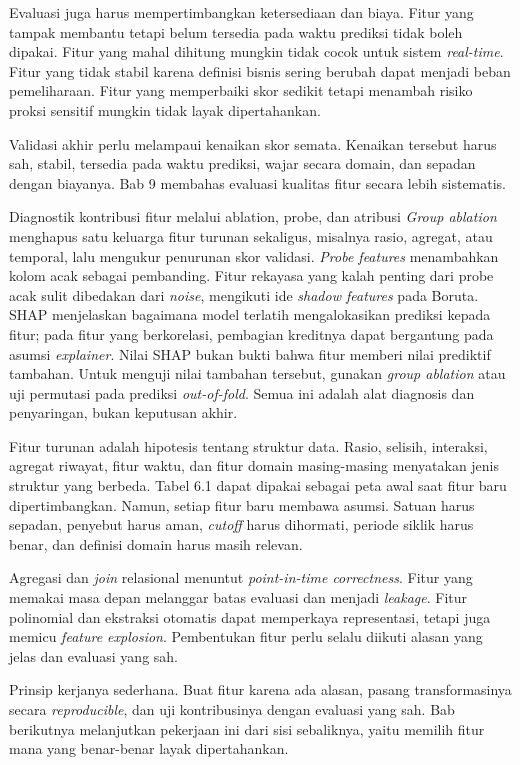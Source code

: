 Evaluasi juga harus mempertimbangkan ketersediaan dan biaya. Fitur yang tampak membantu tetapi belum tersedia pada waktu prediksi tidak boleh dipakai. Fitur yang mahal dihitung mungkin tidak cocok untuk sistem \emph{real-time}. Fitur yang tidak stabil karena definisi bisnis sering berubah dapat menjadi beban pemeliharaan. Fitur yang memperbaiki skor sedikit tetapi menambah risiko proksi sensitif mungkin tidak layak dipertahankan.

Validasi akhir perlu melampaui kenaikan skor semata. Kenaikan tersebut harus sah, stabil, tersedia pada waktu prediksi, wajar secara domain, dan sepadan dengan biayanya. Bab 9 membahas evaluasi kualitas fitur secara lebih sistematis.

\begin{pendalaman}{Diagnostik kontribusi fitur melalui ablation, probe, dan atribusi}
\emph{Group ablation} menghapus satu keluarga fitur turunan sekaligus, misalnya rasio, agregat, atau temporal, lalu mengukur penurunan skor validasi. \emph{Probe features} menambahkan kolom acak sebagai pembanding. Fitur rekayasa yang kalah penting dari probe acak sulit dibedakan dari \emph{noise}, mengikuti ide \emph{shadow features} pada Boruta. SHAP menjelaskan bagaimana model terlatih mengalokasikan prediksi kepada fitur; pada fitur yang berkorelasi, pembagian kreditnya dapat bergantung pada asumsi \emph{explainer}. Nilai SHAP bukan bukti bahwa fitur memberi nilai prediktif tambahan. Untuk menguji nilai tambahan tersebut, gunakan \emph{group ablation} atau uji permutasi pada prediksi \emph{out-of-fold}. Semua ini adalah alat diagnosis dan penyaringan, bukan keputusan akhir.
\end{pendalaman}

\begin{sintesis}

Fitur turunan adalah hipotesis tentang struktur data. Rasio, selisih, interaksi, agregat riwayat, fitur waktu, dan fitur domain masing-masing menyatakan jenis struktur yang berbeda. Tabel 6.1 dapat dipakai sebagai peta awal saat fitur baru dipertimbangkan. Namun, setiap fitur baru membawa asumsi. Satuan harus sepadan, penyebut harus aman, \emph{cutoff} harus dihormati, periode siklik harus benar, dan definisi domain harus masih relevan.

Agregasi dan \emph{join} relasional menuntut \emph{point-in-time correctness}. Fitur yang memakai masa depan melanggar batas evaluasi dan menjadi \emph{leakage}. Fitur polinomial dan ekstraksi otomatis dapat memperkaya representasi, tetapi juga memicu \emph{feature explosion}. Pembentukan fitur perlu selalu diikuti alasan yang jelas dan evaluasi yang sah.

Prinsip kerjanya sederhana. Buat fitur karena ada alasan, pasang transformasinya secara \emph{reproducible}, dan uji kontribusinya dengan evaluasi yang sah. Bab berikutnya melanjutkan pekerjaan ini dari sisi sebaliknya, yaitu memilih fitur mana yang benar-benar layak dipertahankan.

\end{sintesis}

